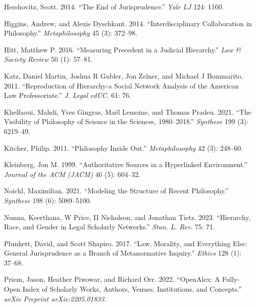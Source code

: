 \documentclass[
]{article}
\newlength{\cslhangindent}
\newlength{\cslentryspacingunit} %
\newenvironment{CSLReferences}[2] %
 {%
  \setlength{\parindent}{0pt}
  \ifodd #1
  \let\oldpar\par
  \def\par{\hangindent=\cslhangindent\oldpar}
  \fi
  \setlength{\parskip}{#2\cslentryspacingunit}
 }%
 {}
\begin{document}
\begin{CSLReferences}{1}{0}
\leavevmode{}%
Hershovitz, Scott. 2014. {``The End of Jurisprudence.''} \emph{Yale LJ} 124: 1160.

\leavevmode{}%
Higgins, Andrew, and Alexis Dyschkant. 2014. {``Interdisciplinary Collaboration in Philosophy.''} \emph{Metaphilosophy} 45 (3): 372--98.

\leavevmode{}%
Hitt, Matthew P. 2016. {``Measuring Precedent in a Judicial Hierarchy.''} \emph{Law \& Society Review} 50 (1): 57--81.

\leavevmode{}%
Katz, Daniel Martin, Joshua R Gubler, Jon Zelner, and Michael J Bommarito. 2011. {``Reproduction of Hierarchy-a Social Network Analysis of the American Law Professoriate.''} \emph{J. Legal edUC.} 61: 76.

\leavevmode{}%
Khelfaoui, Mahdi, Yves Gingras, Maël Lemoine, and Thomas Pradeu. 2021. {``The Visibility of Philosophy of Science in the Sciences, 1980--2018.''} \emph{Synthese} 199 (3): 6219--49.

\leavevmode{}%
Kitcher, Philip. 2011. {``Philosophy Inside Out.''} \emph{Metaphilosophy} 42 (3): 248--60.

\leavevmode{}%
Kleinberg, Jon M. 1999. {``Authoritative Sources in a Hyperlinked Environment.''} \emph{Journal of the ACM (JACM)} 46 (5): 604--32.

\leavevmode{}%
Noichl, Maximilian. 2021. {``Modeling the Structure of Recent Philosophy.''} \emph{Synthese} 198 (6): 5089--5100.

\leavevmode{}%
Nunna, Keerthana, W Price, II Nicholson, and Jonathan Tietz. 2023. {``Hierarchy, Race, and Gender in Legal Scholarly Networks.''} \emph{Stan. L. Rev.} 75: 71.

\leavevmode{}%
Plunkett, David, and Scott Shapiro. 2017. {``Law, Morality, and Everything Else: General Jurisprudence as a Branch of Metanormative Inquiry.''} \emph{Ethics} 128 (1): 37--68.

\leavevmode{}%
Priem, Jason, Heather Piwowar, and Richard Orr. 2022. {``OpenAlex: A Fully-Open Index of Scholarly Works, Authors, Venues, Institutions, and Concepts.''} \emph{arXiv Preprint arXiv:2205.01833}.


\end{CSLReferences}
\end{document}
